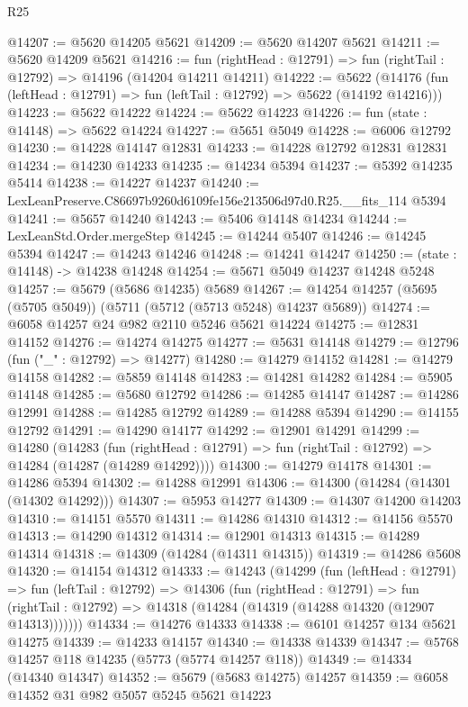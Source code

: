 \begin{lexlean}{R25}
\begin{coremodule}
@14207 := @5620 @14205 @5621
@14209 := @5620 @14207 @5621
@14211 := @5620 @14209 @5621
@14216 := fun (rightHead : @12791) => fun (rightTail : @12792) => @14196 (@14204 @14211 @14211)
@14222 := @5622
    (@14176 (fun (leftHead : @12791) => fun (leftTail : @12792) => @5622 (@14192 @14216)))
@14223 := @5622 @14222
@14224 := @5622 @14223
@14226 := fun (state : @14148) => @5622 @14224
@14227 := @5651 @5049
@14228 := @6006 @12792
@14230 := @14228 @14147 @12831
@14233 := @14228 @12792 @12831 @12831
@14234 := @14230 @14233
@14235 := @14234 @5394
@14237 := @5392 @14235 @5414
@14238 := @14227 @14237
@14240 := LexLeanPreserve.C86697b9260d6109fe156e213506d97d0.R25.__fits_114 @5394
@14241 := @5657 @14240
@14243 := @5406 @14148 @14234
@14244 := LexLeanStd.Order.mergeStep
@14245 := @14244 @5407
@14246 := @14245 @5394
@14247 := @14243 @14246
@14248 := @14241 @14247
@14250 := (state : @14148) -> @14238 @14248
@14254 := @5671 @5049 @14237 @14248 @5248
@14257 := @5679 (@5686 @14235) @5689
@14267 := @14254 @14257 (@5695 (@5705 @5049)) (@5711 (@5712 (@5713 @5248) @14237 @5689))
@14274 := @6058 @14257 @24 @982 @2110 @5246 @5621 @14224
@14275 := @12831 @14152
@14276 := @14274 @14275
@14277 := @5631 @14148
@14279 := @12796 (fun ("_" : @12792) => @14277)
@14280 := @14279 @14152
@14281 := @14279 @14158
@14282 := @5859 @14148
@14283 := @14281 @14282
@14284 := @5905 @14148
@14285 := @5680 @12792
@14286 := @14285 @14147
@14287 := @14286 @12991
@14288 := @14285 @12792
@14289 := @14288 @5394
@14290 := @14155 @12792
@14291 := @14290 @14177
@14292 := @12901 @14291
@14299 := @14280
    (@14283
      (fun (rightHead : @12791) => fun (rightTail : @12792) => @14284 (@14287 (@14289 @14292))))
@14300 := @14279 @14178
@14301 := @14286 @5394
@14302 := @14288 @12991
@14306 := @14300 (@14284 (@14301 (@14302 @14292)))
@14307 := @5953 @14277
@14309 := @14307 @14200 @14203
@14310 := @14151 @5570
@14311 := @14286 @14310
@14312 := @14156 @5570
@14313 := @14290 @14312
@14314 := @12901 @14313
@14315 := @14289 @14314
@14318 := @14309 (@14284 (@14311 @14315))
@14319 := @14286 @5608
@14320 := @14154 @14312
@14333 := @14243
    (@14299
      (fun (leftHead : @12791) =>
      fun (leftTail : @12792) =>
      @14306
        (fun (rightHead : @12791) =>
        fun (rightTail : @12792) => @14318 (@14284 (@14319 (@14288 @14320 (@12907 @14313)))))))
@14334 := @14276 @14333
@14338 := @6101 @14257 @134 @5621 @14275
@14339 := @14233 @14157
@14340 := @14338 @14339
@14347 := @5768 @14257 @118 @14235 (@5773 (@5774 @14257 @118))
@14349 := @14334 (@14340 @14347)
@14352 := @5679 (@5683 @14275) @14257
@14359 := @6058 @14352 @31 @982 @5057 @5245 @5621 @14223

\end{coremodule}
\end{lexlean}
